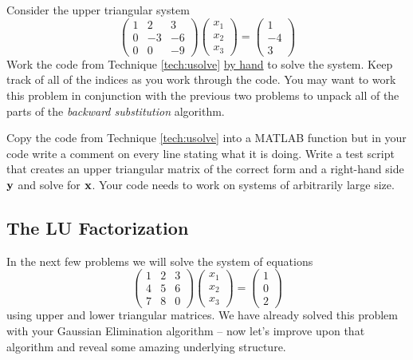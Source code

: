 \begin{problem}
    Consider the upper triangular system
    \[ \begin{pmatrix} 1 & 2 & 3 \\ 0 & -3 & -6 \\ 0 & 0 & -9 \end{pmatrix}
        \begin{pmatrix} x_1 \\ x_2 \\ x_3 \end{pmatrix} = \begin{pmatrix} 1 \\ -4 \\
        3\end{pmatrix} \]
    Work the code from Technique \ref{tech:usolve} \underline{by hand} to solve the
    system.  Keep track of all of the indices as you work through the code.  You may want
    to work this problem in conjunction with the previous two problems to unpack all of
    the parts of the {\it backward substitution} algorithm.
\end{problem}

\begin{problem}
    Copy the code from Technique \ref{tech:usolve} into a MATLAB function but in your code
    write a comment on every line stating what it is doing.  Write a test script that
    creates an upper triangular matrix of the correct form and a right-hand side ${\bf y}$ and
    solve for ${\bf x}$.  Your code needs to work on systems of arbitrarily large size.
\end{problem}

\subsection{The LU Factorization}
In the next few problems we will solve the system of equations
\[ \begin{pmatrix} 1 & 2 & 3 \\ 4 & 5 & 6 \\ 7 & 8 & 0 \end{pmatrix} \begin{pmatrix} x_1
    \\ x_2 \\ x_3 \end{pmatrix} = \begin{pmatrix} 1 \\ 0 \\ 2 \end{pmatrix} \]
using upper and lower triangular matrices.  We have already solved this problem with your
Gaussian Elimination algorithm -- now let's improve upon that algorithm and reveal some
amazing underlying structure.

